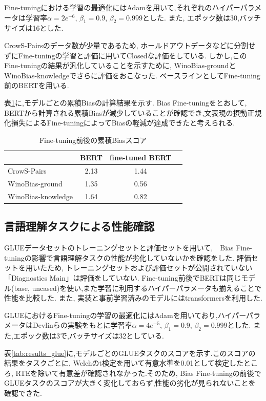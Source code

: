 \documentclass[
  platex, dvipdfmx %
]{nlp2021}
\begin{document}
Fine-tuningにおける学習の最適化にはAdamを用いて,それぞれのハイパーパラメータは学習率$\alpha = 2e^{-6}$, $\beta_1 = 0.9$, $\beta_2 = 0.999$とした.
また, エポック数は30,バッチサイズは16とした.

CrowS-Pairsのデータ数が少量であるため, ホールドアウトデータなどに分割せずにFine-tuningの学習と評価に用いてClosedな評価をしている.
しかし,このFine-tuningの結果が汎化していることを示すために, WinoBias-groundとWinoBias-knowledgeでさらに評価をおこなった.
ベースラインとしてFine-tuning前のBERTを用いる.

表\ref{tab:results_bias}に,モデルごとの累積Biasの計算結果を示す.
Bias Fine-tuningをとおして, BERTから計算される累積Biasが減少していることが確認でき,文表現の摂動正規化損失によるFine-tuningによってBiasの軽減が達成できたと考えられる.

\begin{table}[h]
\centering
\begin{tabular}{lccc}
\hline
 &  BERT & fine-tuned BERT \\
\hline
CrowS-Pairs & 2.13 &  1.44 \\
WinoBias-ground & 1.35 &  0.56  \\
WinoBias-knowledge & 1.64 & 0.82 \\
\hline
\end{tabular}
\caption{Fine-tuning前後の累積Biasスコア}
\label{tab:results_bias}
\end{table}

\subsection{言語理解タスクによる性能確認}
GLUEデータセットのトレーニングセットと評価セットを用いて,　Bias Fine-tuningの影響で言語理解タスクの性能が劣化していないかを確認をした.
評価セットを用いたため, トレーニングセットおよび評価セットが公開されていない「Diagnostics Main」は評価をしていない.
Fine-tuning前後でBERTは同じモデル(base, uncased)を使い,また学習に利用するハイパーパラメータも揃えることで性能を比較した.
また, 実装と事前学習済みのモデルにはtransformers\cite{wolf-etal-2020-transformers}を利用した.

GLUEにおけるFine-tuningの学習の最適化にはAdamを用いており,ハイパーパラメータはDevlinら\cite{devlin2018bert}の実験をもとに学習率$\alpha = 4e^{-5}$, $\beta_1 = 0.9$, $\beta_2 = 0.999$とした.
また,エポック数は3で,バッチサイズは32としている.

表\ref{tab:results_glue}に,モデルごとのGLUEタスクのスコアを示す.このスコアの結果をタスクごとに, Welchのt検定を用いて有意水準を0.01として検定したところ, RTEを除いて有意差が確認されなかった.そのため, Bias Fine-tuningの前後でGLUEタスクのスコアが大きく変化しておらず,性能の劣化が見られないことを確認できた.
\end{document}
